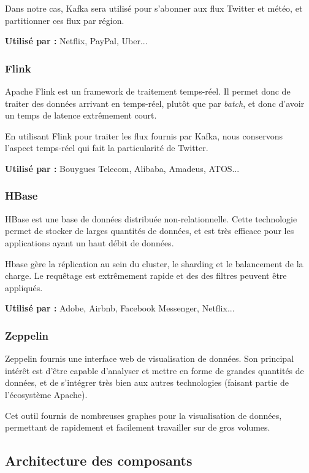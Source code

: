 \documentclass[a4paper,oneside,10pt]{article}
\begin{document}
Dans notre cas, Kafka sera utilisé pour s'abonner aux flux Twitter et météo, et partitionner ces flux par région.

\textbf{Utilisé par :} Netflix, PayPal, Uber...

\subsubsection{Flink}
Apache Flink est un framework de traitement temps-réel. Il permet donc de traiter des données arrivant en temps-réel, plutôt que par \textit{batch}, et donc d'avoir un temps de latence extr\^emement court.

En utilisant Flink pour traiter les flux fournis par Kafka, nous conservons l'aspect temps-réel qui fait la particularité de Twitter.

\textbf{Utilisé par :} Bouygues Telecom, Alibaba, Amadeus, ATOS...

\subsubsection{HBase}
HBase est une base de données distribuée non-relationnelle. Cette technologie permet de stocker de larges quantités de données, et est très efficace pour les applications ayant un haut débit de données.

Hbase gère la réplication au sein du cluster, le sharding et le balancement de la charge. Le requêtage est extrêmement rapide et des des filtres peuvent être appliqués.

\textbf{Utilisé par :} Adobe, Airbnb, Facebook Messenger, Netflix...

\subsubsection{Zeppelin}
Zeppelin fournis une interface web de visualisation de données. Son principal intérêt est d'être capable d'analyser et mettre en forme de grandes quantités de données, et de s'intégrer très bien aux autres technologies (faisant partie de l'écosystème Apache).

Cet outil fournis de nombreuses graphes pour la visualisation de données, permettant de rapidement et facilement travailler sur de gros volumes.

\subsection{Architecture des composants}
\end{document}
